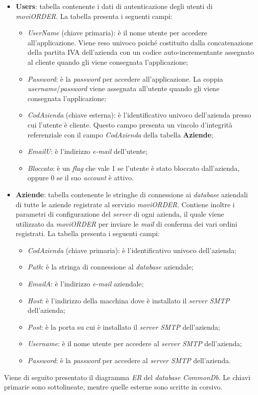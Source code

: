 \begin{itemize}
	\item \textbf{Users}: tabella contenente i dati di autenticazione degli utenti di \textit{moviORDER}. La tabella presenta i seguenti campi:
		\begin{itemize}
			\item \textit{UserName} (chiave primaria): è il nome utente per accedere all'applicazione. Viene reso univoco poiché costituito dalla concatenazione della partita IVA dell'azienda con un codice auto-incrementante assegnato al cliente quando gli viene consegnata l'applicazione;
			\item \textit{Password}: è la \textit{password} per accedere all'applicazione. La coppia \textit{username}/\textit{password} viene assegnata all'utente quando gli viene consegnata l'applicazione;
			\item \textit{CodAzienda} (chiave esterna): è l'identificativo univoco dell'azienda presso cui l'utente è cliente. Questo campo presenta un vincolo d'integrità referenziale con il campo \textit{CodAzienda} della tabella \textbf{Aziende};
			\item \textit{EmailU}: è l'indirizzo \textit{e-mail} dell'utente;
			\item \textit{Bloccato}: è un \textit{flag} che vale 1 se l'utente è stato bloccato dall'azienda, oppure 0 se il suo \textit{account} è attivo.
		\end{itemize}
	\item \textbf{Aziende}: tabella contenente le stringhe di connessione ai \textit{database} aziendali di tutte le aziende registrate al servizio \textit{moviORDER}. Contiene inoltre i parametri di configurazione del \textit{server}  di ogni azienda, il quale viene utilizzato da \textit{moviORDER} per inviare le \textit{mail} di conferma dei vari ordini registrati. La tabella presenta i seguenti campi:
	\begin{itemize}
		\item \textit{CodAzienda} (chiave primaria): è l'identificativo univoco dell'azienda;
		\item \textit{Path}: è la stringa di connessione al \textit{database} aziendale;
		\item \textit{EmailA}: è l'indirizzo \textit{e-mail} aziendale;
		\item \textit{Host}: è l'indirizzo della macchina dove è installato il \textit{server SMTP} dell'azienda;
		\item \textit{Post}: è la porta su cui è installato il \textit{server SMTP} dell'azienda;
		\item \textit{Username}: è il nome utente per accedere al \textit{server SMTP} dell'azienda;
		\item \textit{Password}: è la \textit{password} per accedere al \textit{server SMTP} dell'azienda.
	\end{itemize}
\end{itemize}
Viene di seguito presentato il diagramma \textit{ER} del \textit{database} \textit{CommonDb}. Le chiavi primarie sono sottolineate, mentre quelle esterne sono scritte in corsivo.

